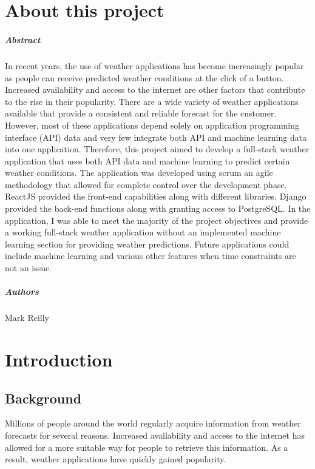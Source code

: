 
\chapter*{About this project}
\paragraph{Abstract}

In recent years, the use of weather applications has become increasingly popular as people can receive predicted weather conditions at the click of a button. Increased availability and access to the internet are other factors that contribute to the rise in their popularity. There are a wide variety of weather applications available that provide a consistent and reliable forecast for the customer. However, most of these applications depend solely on application programming interface (API) data and very few integrate both API and machine learning data into one application. Therefore, this project aimed to develop a full-stack weather application that uses both API data and machine learning to predict certain weather conditions. The application was developed using scrum an agile methodology that allowed for complete control over the development phase. ReactJS provided the front-end capabilities along with different libraries. Django provided the back-end functions along with granting access to PostgreSQL. In the application, I was able to meet the majority of the project objectives and provide a working full-stack weather application without an implemented machine learning section for providing weather predictions. Future applications could include machine learning and various other features when time constraints are not an issue. 

\paragraph{Authors}
Mark Reilly

\chapter{Introduction}

\section{Background}
Millions of people around the world regularly acquire information from weather forecasts for several reasons. Increased availability and access to the internet has allowed for a more suitable way for people to retrieve this information. As a result, weather applications have quickly gained popularity.

